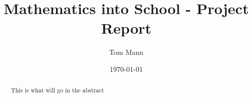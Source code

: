 \documentclass[11pt, a4paper]{report}
\title{Mathematics into School - Project Report}
\author{Tom Mann}
\date{\today}
\begin{document}
\maketitle

\begin{abstract}
    This is what will go in the abstract
\end{abstract}
\end{document}
